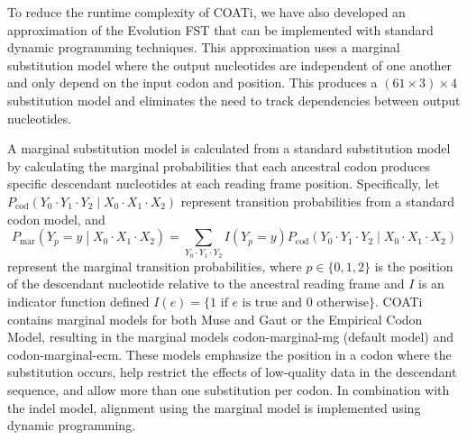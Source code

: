 To reduce the runtime complexity of COATi, we have also developed an approximation of the Evolution FST that can be implemented with standard dynamic programming techniques. This approximation uses a marginal substitution model where the output nucleotides are independent of one another and only depend on the input codon and position. This produces a $\left(61 \times 3 \right) \times 4$ substitution model and eliminates the need to track dependencies between output nucleotides.

A marginal substitution model is calculated from a standard substitution model by calculating the marginal probabilities that each ancestral codon produces specific descendant nucleotides at each reading frame position.
%
Specifically, let
$P_\text{cod}\left(Y_0 \cdot Y_1 \cdot Y_2 \middle| X_0 \cdot X_1 \cdot X_2\right)$ represent transition probabilities from a standard codon model, and
%
\[
P_\text{mar}\left(Y_p = y \middle| X_0 \cdot X_1 \cdot X_2\right) =
\sum_{Y_0 \cdot Y_1 \cdot Y_2} I(Y_p = y) P_\text{cod}\left(Y_0 \cdot Y_1 \cdot Y_2 \middle| X_0 \cdot X_1 \cdot X_2\right)
\]
%
represent the marginal transition probabilities, where
$p \in \{0, 1, 2\}$ is the position of the descendant nucleotide relative to the ancestral reading frame and $I$ is an indicator function defined
%
$I(e) = \{ 1 \text{ if $e$ is true and } 0 \text{ otherwise}\}$.
%
COATi contains marginal models for both Muse and Gaut or the Empirical Codon Model, resulting in the marginal models codon-marginal-mg (default model) and codon-marginal-ecm.
These models emphasize the position in a codon where the substitution occurs, help restrict the effects of low-quality data in the descendant sequence, and allow more than one substitution per codon.
In combination with the indel model, alignment using the marginal model is implemented using dynamic programming.
